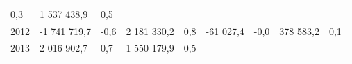 \begin{longtable}[]{@{}lllllllll@{}}
\begin{minipage}[t]{0.06\columnwidth}
0,3\strut
\end{minipage} & \begin{minipage}[t]{0.10\columnwidth}\raggedright
1 537 438,9\strut
\end{minipage} & \begin{minipage}[t]{0.06\columnwidth}\raggedright
0,5\strut
\end{minipage}\tabularnewline
\begin{minipage}[t]{0.05\columnwidth}\raggedright
2012\strut
\end{minipage} & \begin{minipage}[t]{0.10\columnwidth}\raggedright
-1 741 719,7\strut
\end{minipage} & \begin{minipage}[t]{0.06\columnwidth}\raggedright
-0,6\strut
\end{minipage} & \begin{minipage}[t]{0.16\columnwidth}\raggedright
2 181 330,2\strut
\end{minipage} & \begin{minipage}[t]{0.06\columnwidth}\raggedright
0,8\strut
\end{minipage} & \begin{minipage}[t]{0.12\columnwidth}\raggedright
-61 027,4\strut
\end{minipage} & \begin{minipage}[t]{0.06\columnwidth}\raggedright
-0,0\strut
\end{minipage} & \begin{minipage}[t]{0.10\columnwidth}\raggedright
378 583,2\strut
\end{minipage} & \begin{minipage}[t]{0.06\columnwidth}\raggedright
0,1\strut
\end{minipage}\tabularnewline
\begin{minipage}[t]{0.05\columnwidth}\raggedright
2013\strut
\end{minipage} & \begin{minipage}[t]{0.10\columnwidth}\raggedright
2 016 902,7\strut
\end{minipage} & \begin{minipage}[t]{0.06\columnwidth}\raggedright
0,7\strut
\end{minipage} & \begin{minipage}[t]{0.16\columnwidth}\raggedright
1 550 179,9\strut
\end{minipage} & \begin{minipage}[t]{0.06\columnwidth}\raggedright
0,5\strut

\end{minipage}
\end{longtable}
